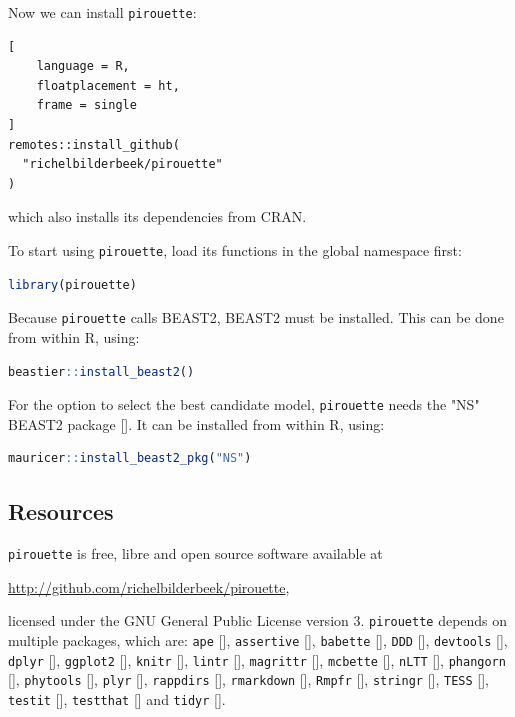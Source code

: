 Now we can install \verb;pirouette;:
\begin{lstlisting}[
    language = R,
    floatplacement = ht,
    frame = single
]
remotes::install_github(
  "richelbilderbeek/pirouette"
)
\end{lstlisting}
which also installs its dependencies from CRAN.

To start using \verb;pirouette;, 
load its functions in the global namespace first:
\begin{lstlisting}[language=R, floatplacement=ht, frame=single]
library(pirouette)
\end{lstlisting}
Because \verb;pirouette; calls BEAST2, BEAST2 must be installed. 
This can be done from within R, using:
\begin{lstlisting}[language=R, floatplacement=ht, frame=single]
beastier::install_beast2()
\end{lstlisting}
For the option to select the best candidate model,
\verb;pirouette; needs the "NS" BEAST2 package [\cite{russel2019model}].
It can be installed from within R, using:
\begin{lstlisting}[language=R, floatplacement=ht, frame=single]
mauricer::install_beast2_pkg("NS")
\end{lstlisting}

\subsection{Resources}
\label{subsec:resources}

\verb;pirouette; is free, libre and open source software available at 
\begin{sloppypar}
  \url{http://github.com/richelbilderbeek/pirouette},
\end{sloppypar}
licensed under the GNU General Public License version 3.
\verb;pirouette; depends on multiple packages, which are:
\verb;ape; [\cite{ape}],
\verb;assertive; [\cite{assertive}],
\verb;babette; [\cite{bilderbeek2018babette}],
\verb;DDD; [\cite{DDD}],
\verb;devtools; [\cite{devtools}],
\verb;dplyr; [\cite{dplyr}],
\verb;ggplot2; [\cite{ggplot2}],
\verb;knitr; [\cite{knitr}],
\verb;lintr; [\cite{lintr}],
\verb;magrittr; [\cite{magrittr}],
\verb;mcbette; [\cite{mcbette}],
\verb;nLTT; [\cite{nLTT}],
\verb;phangorn; [\cite{phangorn}],
\verb;phytools; [\cite{phytools}],
\verb;plyr; [\cite{plyr}],
\verb;rappdirs; [\cite{rappdirs}],
\verb;rmarkdown; [\cite{rmarkdown}],
\verb;Rmpfr; [\cite{Rmpfr}],
\verb;stringr; [\cite{stringr}],
\verb;TESS; [\cite{TESS}],
\verb;testit; [\cite{testit}], 
\verb;testthat; [\cite{testthat}] and
\verb;tidyr; [\cite{tidyr}].

